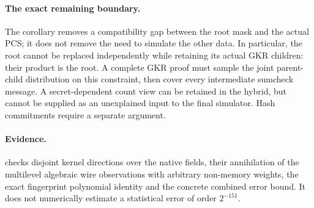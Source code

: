 \paragraph{The exact remaining boundary.} The corollary removes a compatibility gap between the root mask and the actual PCS; it does not remove the need to simulate the other data. In particular, the root cannot be replaced independently while retaining its actual GKR children: their product is the root. A complete GKR proof must sample the joint parent-child distribution on this constraint, then cover every intermediate sumcheck message. A secret-dependent count view can be retained in the hybrid, but cannot be supplied as an unexplained input to the final simulator. Hash commitments require a separate argument.

\paragraph{Evidence.}  checks disjoint kernel directions over the native fields, their annihilation of the multilevel algebraic wire observations with arbitrary non-memory weights, the exact fingerprint polynomial identity and the concrete combined error bound. It does not numerically estimate a statistical error of order $2^{-151}$.
